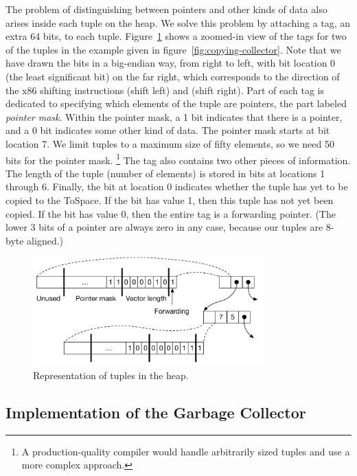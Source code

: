 \documentclass[7x10]{TimesAPriori_MIT}%
\numberwithin{theorem}{chapter}
\numberwithin{definition}{chapter}
\numberwithin{equation}{chapter}
\begin{document}
The problem of distinguishing between pointers and other kinds of data
also arises inside each tuple on the heap. We solve this problem by
attaching a tag, an extra 64 bits, to each
tuple. Figure~\ref{fig:tuple-rep} shows a zoomed-in view of the tags for
two of the tuples in the example given in figure~\ref{fig:copying-collector}.
Note that we have drawn the bits in a big-endian way, from right to left,
with bit location 0 (the least significant bit) on the far right,
which corresponds to the direction of the x86 shifting instructions
 (shift left) and  (shift right). Part of each tag
is dedicated to specifying which elements of the tuple are pointers,
the part labeled \emph{pointer mask}. Within the pointer mask, a 1 bit
indicates that there is a pointer, and a 0 bit indicates some other kind of
data. The pointer mask starts at bit location 7. We limit tuples to a
maximum size of fifty elements, so we need 50 bits for the pointer
mask.%
%
\footnote{A production-quality compiler would handle
arbitrarily sized tuples and use a more complex approach.}
%
The tag also contains two other pieces of information. The length of
the tuple (number of elements) is stored in bits at locations 1 through
6. Finally, the bit at location 0 indicates whether the tuple has yet
to be copied to the ToSpace.  If the bit has value 1, then this tuple
has not yet been copied.  If the bit has value 0, then the entire tag
is a forwarding pointer. (The lower 3 bits of a pointer are always
zero in any case, because our tuples are 8-byte aligned.)

\begin{figure}[tbp]
  \centering
  \begin{tcolorbox}[colback=white]
    \includegraphics[width=0.8\textwidth]{figs/tuple-rep}
  \end{tcolorbox}
  \caption{Representation of tuples in the heap.}
\label{fig:tuple-rep}
\end{figure}

\subsection{Implementation of the Garbage Collector}
\label{sec:organize-gz}
\end{document}
